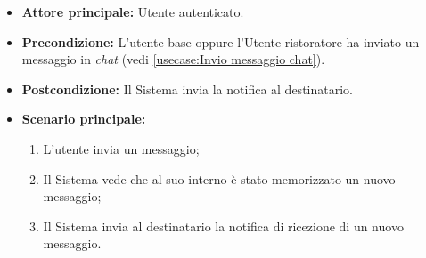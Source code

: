 \label{usecase:Notifica chat}
\begin{itemize}
    \item \textbf{Attore principale:} Utente autenticato.
	
	\item \textbf{Precondizione:} L'utente base oppure l'Utente ristoratore ha inviato un messaggio in \textit{chat} (vedi \autoref{usecase:Invio messaggio chat}).

	\item \textbf{Postcondizione:} Il Sistema invia la notifica al destinatario.
     
	\item \textbf{Scenario principale:}
	      \begin{enumerate}
                \item L'utente invia un messaggio;
                \item Il Sistema vede che al suo interno è stato memorizzato un nuovo messaggio;
                \item Il Sistema invia al destinatario la notifica di ricezione di un nuovo messaggio.
	      \end{enumerate}
\end{itemize}